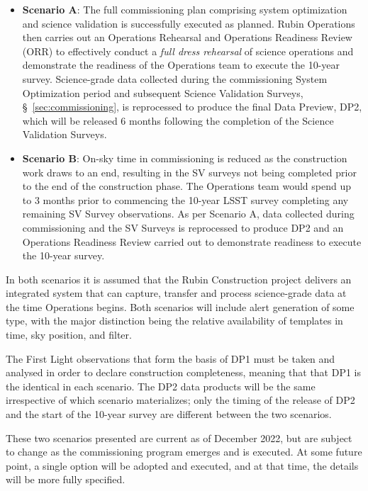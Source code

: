 \begin{itemize}
\item \textbf{Scenario A}:
The full commissioning plan comprising system optimization and science validation is successfully executed as planned. 
Rubin Operations then carries out an Operations Rehearsal and Operations Readiness Review (ORR) to effectively conduct a \textit{full dress rehearsal} of science operations and demonstrate the readiness of the Operations team to execute the 10-year survey. 
Science-grade data collected during the commissioning System Optimization period and subsequent Science Validation Surveys, \S~\ref{sec:commissioning}, is reprocessed to produce the final Data Preview, DP2, which will be released 6 months following the completion of the Science Validation Surveys.

\item \textbf{Scenario B}:
On-sky time in commissioning is reduced as the construction work  draws to an end, resulting in the SV surveys not being completed prior to the end of the construction phase.
The Operations team would spend up to 3 months prior to commencing the 10-year LSST survey completing any remaining SV Survey observations.
As per Scenario A, data collected during commissioning and the SV Surveys is reprocessed to produce DP2 and an Operations Readiness Review carried out to demonstrate readiness to execute the 10-year survey. 
\end{itemize}

In both scenarios it is assumed that the Rubin Construction project delivers an integrated system that can capture, transfer and process science-grade data at the time Operations begins.
Both scenarios will include alert generation of some type, with the major distinction being the relative availability of templates in time, sky position, and filter.

The First Light observations that form the basis of DP1 must be taken and analysed in order to declare construction completeness, meaning that that DP1 is the identical in each scenario.
The DP2 data products will be the same irrespective of which scenario materializes; only the timing of the release of DP2 and the start of the 10-year survey are different between the two scenarios.

These two scenarios presented are current as of December 2022, but are subject to change as the commissioning program emerges and is executed.
At some future point, a single option will be adopted and executed, and at that time, the details will be more fully specified.

